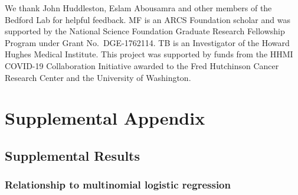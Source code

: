 \documentclass[11pt,oneside,letterpaper]{article}
\begin{document}
We thank John Huddleston, Eslam Abousamra and other members of the Bedford Lab for helpful feedback.
MF is an ARCS Foundation scholar and was supported by the National Science Foundation Graduate Research Fellowship Program under Grant No.\ DGE-1762114.
TB is an Investigator of the Howard Hughes Medical Institute.
This project was supported by funds from the HHMI COVID-19 Collaboration Initiative awarded to the Fred Hutchinson Cancer Research Center and the University of Washington.




\newpage

\appendix

\setcounter{figure}{0}
\setcounter{table}{0}
\setcounter{page}{1}
\renewcommand{\thefigure}{S\arabic{figure}}
\renewcommand{\thetable}{S\arabic{table}}
\renewcommand{\thepage}{S\arabic{page}}

\section*{Supplemental Appendix}

\subsection*{Supplemental Results}

\subsubsection*{Relationship to multinomial logistic regression}
\end{document}
